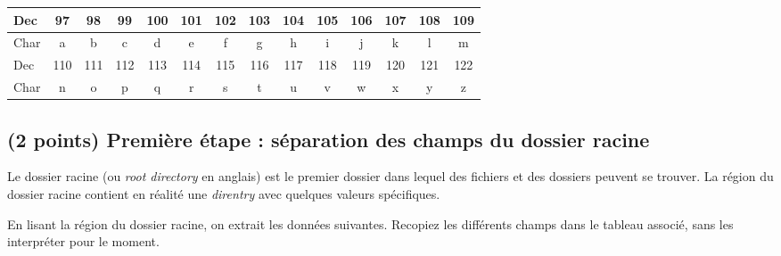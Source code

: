 \documentclass[11pt,a4paper]{article}
\begin{document}
\begin{center}
\begin{tabular}{ | l |c|c|c|c|c|c|c|c|c|c|c|c|c| }
\hline
Dec &  97 & 98 & 99 & 100 & 101 & 102 & 103 & 104 & 105 & 106 & 107 & 108 & 109 \\
\hline
Char &  a &  b &  c &  d  &  e  &  f  &  g  &  h  &  i  &  j  &  k  &  l  &  m \\
\hline
%
%
\hline
Dec &  110 & 111 & 112 & 113 & 114 & 115 & 116 & 117 & 118 & 119 & 120 & 121 & 122 \\
\hline
Char &  n  &  o  &  p  &  q  &  r  &  s  &  t  &  u  &  v  &  w  &  x  &  y  &  z \\
\hline
\end{tabular}

\end{center}



\subsection{(2 points) Première étape : séparation des champs du dossier racine }

Le dossier racine (ou \textit{root directory} en anglais) est le premier dossier dans lequel des fichiers et des dossiers peuvent se trouver.
La région du dossier racine contient en réalité une \textit{direntry} avec quelques valeurs spécifiques.

\medskip

En lisant la région du dossier racine, on extrait les données suivantes.
Recopiez les différents champs dans le tableau associé, sans les interpréter pour le moment.
\end{document}
